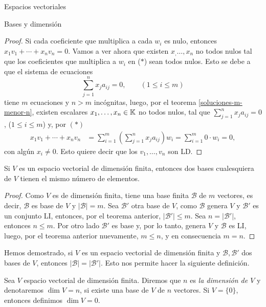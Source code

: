 \begin{chapter}{Espacios vectoriales}
\begin{section}{Bases y dimensi\'on}
\begin{proof}
    Si cada coeficiente que multiplica a cada $w_i$ es nulo, entonces $  x_1v_1 + \cdots+x_nv_n=0$. Vamos a ver ahora que existen $x_,\ldots,x_n$ no todos nulos tal que los coeficientes que multiplica a $w_i$  en ($*$) sean todos nulos. Esto se debe a que el sistema de ecuaciones
    \begin{equation*}
        \sum_{j=1}^{n} x_ja_{ij} = 0, \qquad (1 \le i \le m) 
    \end{equation*}
    tiene $m$ ecuaciones  y $n > m$ incógnitas, luego, por el teorema \ref{soluciones-m-menor-n}, existen escalares $x_1,\ldots,x_n \in \mathbb K$ no todos nulos, tal que $\sum_{j=1}^{n} x_ja_{ij} = 0$, ($1 \le i \le m$) y, por $(*)$
    \begin{align*}
        x_1v_1 + \cdots+x_nv_n &=  \sum_{i=1}^{m}(\sum_{j=1}^{n} x_ja_{ij})w_i = \sum_{i=1}^{m}0\cdot w_i =0,
    \end{align*}
    con algún $x_i \ne 0$. Esto quiere decir que los $v_1,\ldots,v_n$ son LD.
\end{proof}


\begin{corolario}
    Si $V$ es un espacio vectorial de dimensión finita, entonces dos bases cualesquiera de $V$ tienen el mismo número de elementos.
\end{corolario}
\begin{proof}
        Como $V$ es de dimensión finita, tiene una base finita $\mathcal B$  de $m$ vectores, es decir,  $\mathcal B$ es base de $V$ y  $|\mathcal B| = m.$
        Sea $\mathcal B'$  otra base de $V$, como $\mathcal B$  genera $V$ y  $\mathcal B'$ es  un conjunto LI, entonces, por el teorema anterior, $|\mathcal B'| \le m$. Sea $n = |\mathcal B'|$,  entonces $n \le m$. Por otro lado $\mathcal B'$ es base y, por lo tanto,  genera $V$ y  $\mathcal B$ es LI, luego, por el teorema anterior nuevamente,  $m \le n$, y en consecuencia $m=n$.
\end{proof}

Hemos demostrado, si $V$  es un espacio vectorial de dimensión finita y $\mathcal B,\mathcal B' $ dos bases de $V$,  entonces $|\mathcal B|=|\mathcal B'|$. Esto nos permite hacer la siguiente definición. 


\begin{definicion}
    Sea $V$ espacio vectorial de dimensión finita. Diremos que $n$  es \textit{la dimensión de $V$} y  denotaremos $\dim V =n$,  si existe una base de $V$  de $n$  vectores. Si $V = \{0\}$,  entonces definimos $\dim V =0$.
\end{definicion}






\end{section}
\end{chapter}
